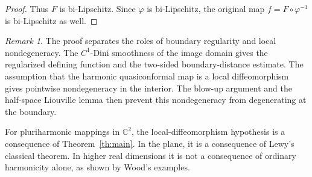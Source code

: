 \documentclass[11pt]{amsart}
\theoremstyle{definition}
\theoremstyle{remark}
\newtheorem{remark}[theorem]{Remark}
\newcommand{\C}{\mathbb C}
\begin{document}
\begin{proof}
Thus \(F\) is bi-Lipschitz. Since \(\varphi\) is bi-Lipschitz, the original
map \(f=F\circ\varphi^{-1}\) is bi-Lipschitz as well.
\end{proof}

\begin{remark}\label{rem:dini-and-local-diffeomorphism}
The proof separates the roles of boundary regularity and local
nondegeneracy.  The \(C^1\)-Dini smoothness of the image domain gives the
regularized defining function and the two-sided boundary-distance estimate.
The assumption that the harmonic quasiconformal map is a local
diffeomorphism gives pointwise nondegeneracy in the interior.  The blow-up
argument and the half-space Liouville lemma then prevent this
nondegeneracy from degenerating at the boundary.

For pluriharmonic mappings in \(\C^2\), the local-diffeomorphism hypothesis
is a consequence of Theorem~\ref{th:main}.  In the plane, it is a consequence
of Lewy's classical theorem.  In higher real dimensions it is not a
consequence of ordinary harmonicity alone, as shown by Wood's examples.
\end{remark}
\end{document}
